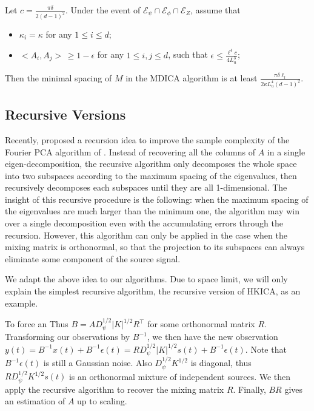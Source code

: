 \documentclass[twoside,11pt]{article}
\newcommand{\Epsi}{\mathcal{E}_{\psi}}
\newcommand{\Ephi}{\mathcal{E}_{\phi}}
\newcommand{\EZ}{\mathcal{E}_{Z}}
\newcommand{\eps}{\epsilon}
\begin{document}
\begin{proposition}
\label{prop:spacingMDICA}
Let $c = \frac{\pi\delta}{2(d-1)^2}$. Under the event of $\Epsi\cap\Ephi\cap \EZ$, assume that
\begin{itemize}
\item $\kappa_i = \kappa$ for any $1\le i\le d$;
\item $<A_i, A_j> \,\ge 1-\eps$ for any $1\le i, j \le d$, such that $\eps \le \frac{\ell^4 c}{4L_u^3}$;
\end{itemize}
Then the minimal spacing of $M$  in the MDICA algorithm is at least $\frac{\pi\delta\ell_l}{2\kappa L_u^4 (d-1)^2}$. 
\end{proposition}

\subsection{Recursive Versions}
Recently, \citet{vempala2014max} proposed a recursion idea to improve the sample complexity of the Fourier PCA algorithm of \citet{goyal2014fourier}. 
Instead of recovering all the columns of $A$ in a single eigen-decomposition, the recursive algorithm only decomposes the whole space into two subspaces according to the maximum spacing of the eigenvalues, 
then recursively decomposes each subspaces until they are all 1-dimensional.
The insight of this recursive procedure is the following: when the maximum spacing of the eigenvalues are much larger than the minimum one, the algorithm may win over a single decomposition even with the accumulating errors through the recursion.
However, this algorithm can only be applied in the case when the mixing matrix is orthonormal, so that the projection to its subspaces can always eliminate some component of the source signal. 

We adapt the above idea to our algorithms. Due to space limit, we will only explain the simplest recursive algorithm, the recursive version of HKICA, as an example.

To force an%
Thus $B = AD_{\psi}^{1/2}|K|^{1/2}R^{\top}$ for some orthonormal matrix $R$. 
Transforming our observations by $B^{-1}$, we then have the new observation $y(t) = B^{-1}x(t) + B^{-1}\eps(t) = RD_{\psi}^{1/2}|K|^{1/2}s(t) + B^{-1}\eps(t)$. 
Note that $B^{-1}\eps(t)$ is still a Gaussian noise. Also $D_{\psi}^{1/2}K^{1/2}$ is diagonal, thus $RD_{\psi}^{1/2}K^{1/2}s(t)$ is an orthonormal mixture of independent sources.
We then apply the recursive algorithm to recover the mixing matrix $R$. Finally, $BR$ gives an estimation of $A$ up to scaling.
\end{document}
